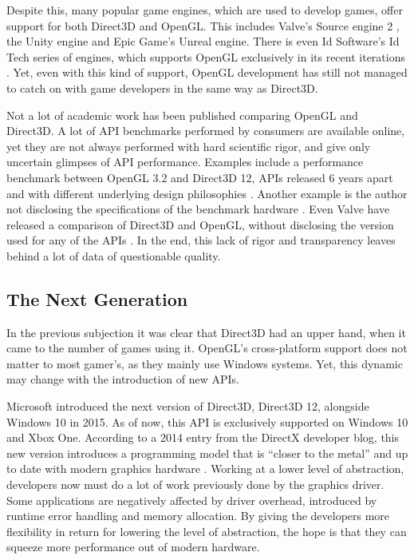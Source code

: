 Despite this, many popular game engines, which are used to develop games, offer support for both Direct3D and OpenGL.
This includes Valve’s Source engine 2 \cite{sourceEngine}, the Unity engine \cite{unityEngine} and Epic Game’s Unreal engine\cite{unrealEngine}.
There is even Id Software’s Id Tech series of engines, which supports OpenGL exclusively in its recent iterations \cite{idTech}.
Yet, even with this kind of support, OpenGL development has still not managed to catch on with game developers in the same way as Direct3D.  

Not a lot of academic work has been published comparing OpenGL and Direct3D.
A lot of \gls{API} benchmarks performed by consumers are available online, yet they are not always performed with hard scientific rigor, and give only uncertain glimpses of \gls{API} performance.
Examples include a performance benchmark between OpenGL 3.2 and Direct3D 12, \glspl{API} released 6 years apart and with different underlying design philosophies \cite{geek3DBenchmark}.
Another example is the author not disclosing the specifications of the benchmark hardware \cite{gTrucBenchmark}.
Even Valve have released a comparison of Direct3D and OpenGL, without disclosing the version used for any of the \glspl{API} \cite{valveBenchmark}.
In the end, this lack of rigor and transparency leaves behind a lot of data of questionable quality.

\subsection{The Next Generation}
In the previous subjection it was clear that Direct3D had an upper hand, when it came to the number of games using it.
OpenGL’s cross-platform support does not matter to most gamer’s, as they mainly use Windows systems.
Yet, this dynamic may change with the introduction of new \glspl{API}.

Microsoft introduced the next version of Direct3D, Direct3D 12, alongside Windows 10 in 2015.
As of now, this \gls{API} is exclusively supported on Windows 10 and Xbox One.
According to a 2014 entry from the DirectX developer blog, this new version introduces a programming model that is “closer to the metal” and up to date with modern graphics hardware \cite{directXBlog}.
Working at a lower level of abstraction, developers now must do a lot of work previously done by the graphics driver.
Some applications are negatively affected by driver overhead, introduced by runtime error handling and memory allocation.
By giving the developers more flexibility in return for lowering the level of abstraction, the hope is that they can squeeze more performance out of modern hardware.
  
